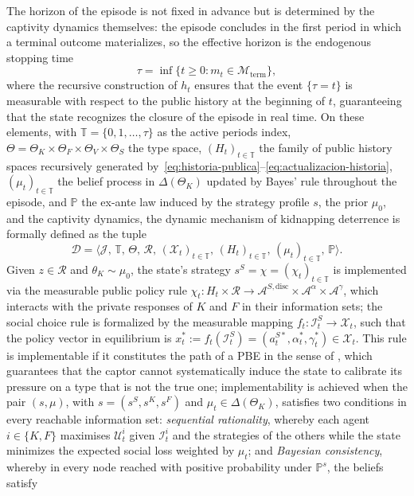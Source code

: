 \documentclass[review,authoryear,12pt]{elsarticle}
\theoremstyle{plain}
\theoremstyle{definition}
\newcommand{\Prob}{\mathbb{P}}
\newcommand{\ThetaK}{\Theta_K}
\newcommand{\1}{\mathbf{1}}
\begin{document}
The horizon of the episode is not fixed in advance but is determined by the captivity dynamics themselves: the episode concludes in the first period in which a terminal outcome materializes, so the effective horizon is the endogenous stopping time
\begin{equation}
\tau=\inf\{t\geq 0:m_t\in\mathcal{M}_{\mathrm{term}}\},\label{eq:stopping-time}
\end{equation}
where the recursive construction of $h_t$ ensures that the event $\{\tau=t\}$ is measurable with respect to the public history at the beginning of $t$, guaranteeing that the state recognizes the closure of the episode in real time. On these elements, with $\mathbb{T}=\{0,1,\ldots,\tau\}$ as the active periods index, $\Theta=\ThetaK\times\Theta_F\times\Theta_V\times\Theta_S$ the type space, $(H_t)_{t\in\mathbb{T}}$ the family of public history spaces recursively generated by~\eqref{eq:historia-publica}--\eqref{eq:actualizacion-historia}, $(\mu_t)_{t\in\mathbb{T}}$ the belief process in $\Delta(\ThetaK)$ updated by Bayes' rule throughout the episode, and $\Prob$ the ex-ante law induced by the strategy profile $s$, the prior $\mu_0$, and the captivity dynamics, the dynamic mechanism of kidnapping deterrence is formally defined as the tuple
\[
\mathcal{D}=\bigl\langle\mathcal{J},\,\mathbb{T},\,\Theta,\,\mathcal{R},\,(\mathcal{X}_t)_{t\in\mathbb{T}},\,(H_t)_{t\in\mathbb{T}},\,(\mu_t)_{t\in\mathbb{T}},\,\Prob\bigr\rangle.
\]
Given $z\in\mathcal{R}$ and $\theta_K\sim\mu_0$, the state's strategy $s^S=\chi=(\chi_t)_{t\in\mathbb{T}}$ is implemented via the measurable public policy rule $\chi_t\colon H_t\times\mathcal{R}\to\mathcal{A}^{S,\mathrm{disc}}\times\mathcal{A}^{\alpha}\times\mathcal{A}^{\gamma}$, which interacts with the private responses of $K$ and $F$ in their information sets; the social choice rule is formalized by the measurable mapping $f_t\colon\mathcal{I}_t^S\to\mathcal{X}_t$, such that the policy vector in equilibrium is $x_t^\ast:=f_t(\mathcal{I}_t^S)=(a_t^{S\ast},\alpha_t^\ast,\gamma_t^\ast)\in\mathcal{X}_t$. This rule is implementable if it constitutes the path of a PBE in the sense of \citet{FudenbergTirole1991}, which guarantees that the captor cannot systematically induce the state to calibrate its pressure on a type that is not the true one; implementability is achieved when the pair $(s,\mu)$, with $s=(s^S,s^K,s^F)$ and $\mu_t\in\Delta(\ThetaK)$, satisfies two conditions in every reachable information set: \emph{sequential rationality}, whereby each agent $i\in\{K,F\}$ maximises $\mathcal{U}_t^i$ given $\mathcal{I}_t^i$ and the strategies of the others while the state minimizes the expected social loss weighted by $\mu_t$; and \emph{Bayesian consistency}, whereby in every node reached with positive probability under $\Prob^s$, the beliefs satisfy
\end{document}
